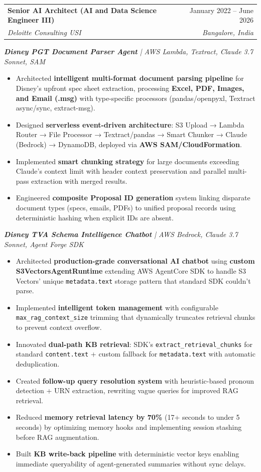 \documentclass[letterpaper,10pt]{article}
\makeatletter
\newcommand{\resumeItem}[1]{
  \item\small{
    {#1 \vspace{-2pt}}
  }
}
\newcommand{\resumeSubheading}[4]{
  \vspace{-2pt}\item
    \begin{tabular*}{0.97\textwidth}[t]{l@{\extracolsep{\fill}}r}
      \textbf{#1} & #2 \\
      \textit{\small#3} & \textit{\small #4} \\
    \end{tabular*}\vspace{-7pt}
}
\newcommand{\resumeItemListStart}{\begin{itemize}}
\newcommand{\resumeItemListEnd}{\end{itemize}\vspace{-5pt}}
\makeatother
\begin{document}
    \resumeSubheading
      {Senior AI Architect (AI and Data Science Engineer III)}{January 2022 -- June 2026}
      {Deloitte Consulting USI}{Bangalore, India}    

    \vspace{12pt}
      \vspace{12pt}
      \textit{\small\textbf{Disney PGT Document Parser Agent} | AWS Lambda, Textract, Claude 3.7 Sonnet, SAM}
      \resumeItemListStart
        \resumeItem{Architected \textbf{intelligent multi-format document parsing pipeline} for Disney's upfront spec sheet extraction, processing \textbf{Excel, PDF, Images, and Email (.msg)} with type-specific processors (pandas/openpyxl, Textract async/sync, extract-msg).}
        \resumeItem{Designed \textbf{serverless event-driven architecture}: S3 Upload → Lambda Router → File Processor → Textract/pandas → Smart Chunker → Claude (Bedrock) → DynamoDB, deployed via \textbf{AWS SAM/CloudFormation}.}
        \resumeItem{Implemented \textbf{smart chunking strategy} for large documents exceeding Claude's context limit with header context preservation and parallel multi-pass extraction with merged results.}
        \resumeItem{Engineered \textbf{composite Proposal ID generation} system linking disparate document types (specs, emails, PDFs) to unified proposal records using deterministic hashing when explicit IDs are absent.}
      \resumeItemListEnd

      \vspace{12pt}
      \textit{\small\textbf{Disney TVA Schema Intelligence Chatbot} | AWS Bedrock, Claude 3.7 Sonnet, Agent Forge SDK}
      \resumeItemListStart
        \resumeItem{Architected \textbf{production-grade conversational AI chatbot} using \textbf{custom S3VectorsAgentRuntime} extending AWS AgentCore SDK to handle S3 Vectors' unique \texttt{metadata.text} storage pattern that standard SDK couldn't parse.}
        \resumeItem{Implemented \textbf{intelligent token management} with configurable \texttt{max\_rag\_context\_size} trimming that dynamically truncates retrieval chunks to prevent context overflow.}
        \resumeItem{Innovated \textbf{dual-path KB retrieval}: SDK's \texttt{extract\_retrieval\_chunks} for standard \texttt{content.text} + custom fallback for \texttt{metadata.text} with automatic deduplication.}
        \resumeItem{Created \textbf{follow-up query resolution system} with heuristic-based pronoun detection + URN extraction, rewriting vague queries for improved RAG retrieval.}
        \resumeItem{Reduced \textbf{memory retrieval latency by 70\%} (17+ seconds to under 5 seconds) by optimizing memory hooks and implementing session stashing before RAG augmentation.}
        \resumeItem{Built \textbf{KB write-back pipeline} with deterministic vector keys enabling immediate queryability of agent-generated summaries without sync delays.}
      \resumeItemListEnd
\end{document}

